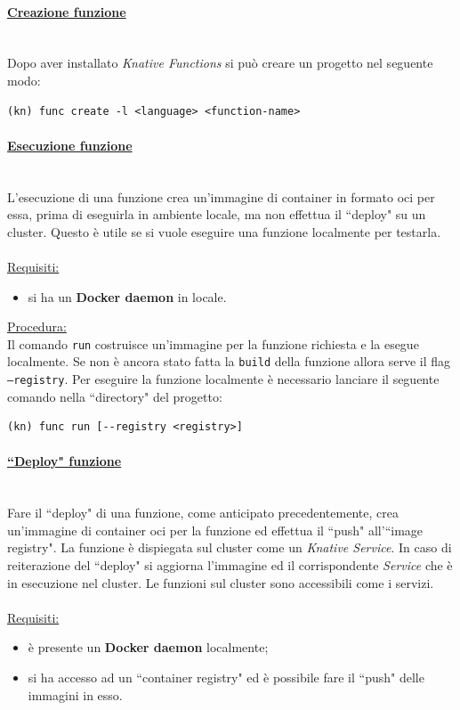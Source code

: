 \documentclass[12pt,a4paper,openany,twoside]{book}
\begin{document}
\paragraph{\underline{Creazione funzione}} ~\\
Dopo aver installato \textit{Knative Functions} si può creare un progetto nel seguente modo:
\begin{lstlisting}
(kn) func create -l <language> <function-name>\end{lstlisting}

\paragraph{\underline{Esecuzione funzione}} ~\\
L'esecuzione di una funzione crea un'immagine di container in formato \ac{oci} per essa, prima di eseguirla in ambiente locale, ma non effettua il ``deploy" su un cluster. Questo è utile se si vuole eseguire una funzione localmente per testarla.
\\ \\
\underline{Requisiti:}
\begin{itemize}
    \item si ha un \textbf{Docker daemon} in locale.
\end{itemize}

\noindent
\underline{Procedura:}
\\
Il comando \texttt{run} costruisce un'immagine per la funzione richiesta e la esegue localmente. Se non è ancora stato fatta la \texttt{build} della funzione allora serve il flag \texttt{--registry}.
Per eseguire la funzione localmente è necessario lanciare il seguente comando nella ``directory" del progetto:
\begin{lstlisting}
(kn) func run [--registry <registry>]\end{lstlisting}


\paragraph{\underline{``Deploy" funzione}} ~\\
Fare il ``deploy" di una funzione, come anticipato precedentemente, crea un'immagine di container \ac{oci} per la funzione ed effettua il ``push" all'``image registry". La funzione è dispiegata sul cluster come un \textit{Knative Service}.
In caso di reiterazione del ``deploy" si aggiorna l'immagine ed il corrispondente \textit{Service} che è in esecuzione nel cluster. Le funzioni sul cluster sono accessibili come i servizi.
\\ \\
\underline{Requisiti:}
\begin{itemize}
    \item è presente un \textbf{Docker daemon} localmente;
    
    \item si ha accesso ad un ``container registry" ed è possibile fare il ``push" delle immagini in esso.
\end{itemize}
\end{document}
